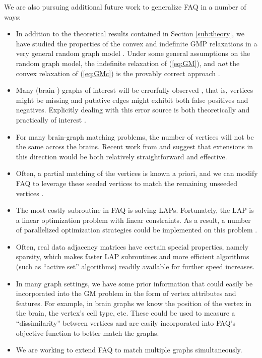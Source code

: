 \documentclass[10pt]{article}
\begin{document}
We are also pursuing additional future work to generalize FAQ in a number of ways:  
\begin{itemize}
\item In addition to the theoretical results contained in Section \ref{sub:theory}, we have studied the properties of the convex and indefinite GMP relaxations in a very general random graph model \cite{lyzinski2014graph}.  
Under some general assumptions on the random graph model, the indefinite relaxation of (\ref{eq:GM}), and {\it not} the convex relaxation of (\ref{eq:GMc}) is the provably correct approach \cite{lyzinski2014graph}.
\item Many (brain-) graphs of interest will be errorfully observed \cite{Priebe2011}, that is, vertices might be missing and putative edges might exhibit both false positives and negatives.  Explicitly dealing with this error source is both theoretically and practically of interest \cite{VP11_unlabeled}.  
\item For many brain-graph matching problems, the number of vertices will not be the same across the brains.  Recent work from \cite{Zaslavskiy2009, Zaslavskiy2010} and \cite{Escolano2011} suggest that extensions in this direction would be both relatively straightforward and effective. 
\item Often, a partial matching of the vertices is known a priori, and we can modify FAQ to leverage these seeded vertices to match the remaining unseeded vertices \cite{sgm2}.
\item The most costly subroutine in FAQ is solving LAPs.  Fortunately, the LAP is a linear optimization problem with linear constraints.  As a result, a number of parallelized optimization strategies could be implemented on this problem \cite{Boyd04a}. 
\item Often, real data adjacency matrices have certain special properties, namely sparsity, which makes faster LAP subroutines \cite{Jonker1987} and more efficient algorithms (such as ``active set'' algorithms) readily available for further speed increases.
\item In many graph settings, we have some prior information that could easily be incorporated into the GM problem in the form of vertex attributes and features.  For example, in brain graphs we know the position of the vertex in the brain, the vertex's cell type, etc.  These could be used to measure a ``dissimilarity'' between vertices and are easily incorporated into FAQ's objective function to better match the graphs.  
\item We are working to extend FAQ to match multiple graphs simultaneously.
\end{itemize}
\end{document}
